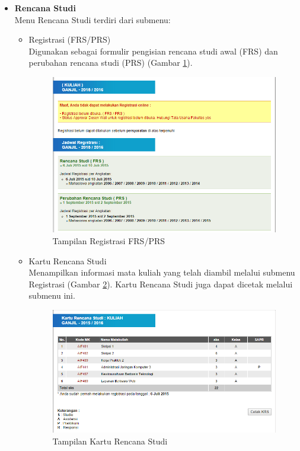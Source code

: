 \begin{enumerate}
\begin{itemize}
		\item \textbf{Rencana Studi}\\
		Menu Rencana Studi terdiri dari submenu: 
		\begin{itemize}
			\item Registrasi (FRS/PRS)\\
			Digunakan sebagai formulir pengisian rencana studi awal (FRS) dan perubahan rencana studi (PRS) (Gambar \ref{fig:3_pam_utama_registrasi}). 			%
			\begin{figure}[H]
				\centering
				\includegraphics[scale=0.5]{Gambar/pam-utama-rencanastudi}
				\caption{Tampilan Registrasi FRS/PRS} 
				\label{fig:3_pam_utama_registrasi}
			\end{figure}
			
			\item Kartu Rencana Studi \\
			Menampilkan informasi mata kuliah yang telah diambil melalui submenu Registrasi (Gambar \ref{fig:3_pam_utama_krs}). Kartu Rencana Studi juga dapat dicetak melalui submenu ini. 
			\begin{figure}[H]
				\centering
				\includegraphics[scale=0.5]{Gambar/pam-utama-krs}
				\caption{Tampilan Kartu Rencana Studi} 
				\label{fig:3_pam_utama_krs}
			\end{figure}
			

\end{itemize}
\end{itemize}
\end{enumerate}
